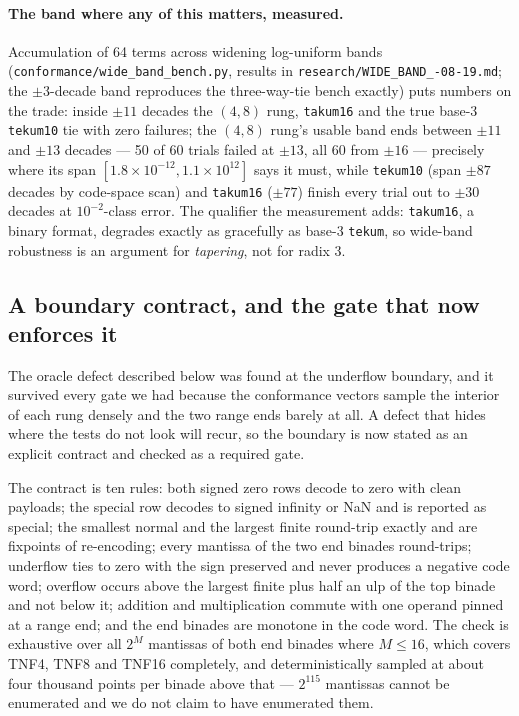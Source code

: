 \paragraph{The band where any of this matters, measured.} Accumulation of 64
terms across widening log-uniform bands (\texttt{conformance/\allowbreak wide\_\allowbreak band\_\allowbreak bench.py},
results in \texttt{research/\allowbreak WIDE\_\allowbreak BAND\_-08-19.md}; the $\pm 3$-decade band
reproduces the three-way-tie bench exactly) puts numbers on the trade: inside
$\pm 11$ decades the $(4,8)$ rung, \texttt{takum16} and the true base-3
\texttt{tekum10} tie with zero failures; the $(4,8)$ rung's usable band ends
between $\pm 11$ and $\pm 13$ decades --- 50 of 60 trials failed at $\pm 13$,
all 60 from $\pm 16$ --- precisely where its span $[1.8 \times 10^{-12},
1.1 \times 10^{12}]$ says it must, while \texttt{tekum10} (span $\pm 87$
decades by code-space scan) and \texttt{takum16} ($\pm 77$) finish every trial
out to $\pm 30$ decades at $10^{-2}$-class error. The qualifier the measurement
adds: \texttt{takum16}, a binary format, degrades exactly as gracefully as
base-3 \texttt{tekum}, so wide-band robustness is an argument for
\emph{tapering}, not for radix 3.

\subsection{A boundary contract, and the gate that now enforces it}
\label{sec:boundarygate}

The oracle defect described below was found at the underflow boundary, and it
survived every gate we had because the conformance vectors sample the interior of
each rung densely and the two range ends barely at all. A defect that hides where
the tests do not look will recur, so the boundary is now stated as an explicit
contract and checked as a required gate.

The contract is ten rules: both signed zero rows decode to zero with clean
payloads; the special row decodes to signed infinity or NaN and is reported as
special; the smallest normal and the largest finite round-trip exactly and are
fixpoints of re-encoding; every mantissa of the two end binades round-trips;
underflow ties to zero with the sign preserved and never produces a negative code
word; overflow occurs above the largest finite plus half an ulp of the top binade
and not below it; addition and multiplication commute with one operand pinned at a
range end; and the end binades are monotone in the code word. The check is
exhaustive over all $2^M$ mantissas of both end binades where $M \le 16$, which
covers TNF4, TNF8 and TNF16 completely, and deterministically sampled at about
four thousand points per binade above that --- $2^{115}$ mantissas cannot be
enumerated and we do not claim to have enumerated them.

